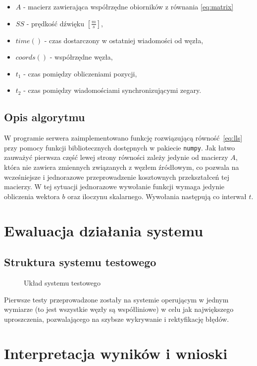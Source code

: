 \begin{itemize}
    \item $A$ - macierz zawierająca współrzędne obiorników z równania \ref{eq:matrix}
    \item $SS$ {-} prędkość dźwięku $\left[\frac{m}{s}\right]$,
    \item $time()$ {-} czas dostarczony w ostatniej wiadomości od węzła,
    \item $coords()$ {-} współrzędne węzła,
    \item $t_1$ {-} czas pomiędzy obliczeniami pozycji,
    \item $t_2$ {-} czas pomiędzy wiadomościami synchronizującymi zegary.
\end{itemize}

\subsection{Opis algorytmu}

W programie serwera zaimplementowano funkcję rozwiązującą równość~\ref{eq:lls} przy pomocy funkcji bibliotecznych dostępnych w pakiecie \texttt{numpy}. Jak łatwo zauważyć pierwsza część lewej strony równości zależy jedynie od macierzy $A$, która nie zawiera zmiennych związanych z węzłem źródłowym, co pozwala na wcześniejsze i jednorazowe przeprowadzenie kosztownych przekształceń tej macierzy. W tej sytuacji jednorazowe wywołanie funkcji wymaga jedynie obliczenia wektora $b$ oraz iloczynu skalarnego. Wywołania następują co interwał $t$.

\section{Ewaluacja działania systemu}

\subsection{Struktura systemu testowego}

\begin{figure}[h]
    \centering
    \caption{Układ systemu testowego}
\label{fig:test_setup}
\end{figure}

Pierwsze testy przeprowadzone zostały na systemie operującym w jednym wymiarze (to jest wszystkie węzły są współliniowe) w celu jak największego uproszczenia, pozwalającego na szybsze wykrywanie i rektyfikację błędów.

\section{Interpretacja wyników i wnioski}